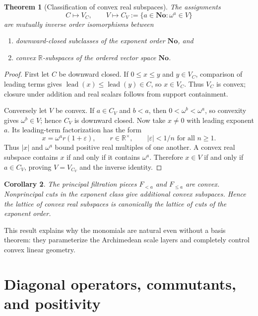 \documentclass[11pt,letterpaper]{article}
\numberwithin{equation}{section}
\newtheorem{theorem}{Theorem}[section]
\newtheorem{corollary}[theorem]{Corollary}
\theoremstyle{definition}
\theoremstyle{remark}
\newcommand{\No}{\mathbf{No}}
\newcommand{\R}{\mathbb{R}}
\newcommand{\lead}{\operatorname{lead}}
\begin{document}
\begin{theorem}[Classification of convex real subspaces]\label{rvs:cv:thm:convex-subspaces}
The assignments
\[
  C\longmapsto V_C,
  \qquad
  V\longmapsto C_V:=\{a\in\No:\omega^a\in V\}
\]
are mutually inverse order isomorphisms between
\begin{enumerate}[label=(\roman*)]
\item downward-closed subclasses of the exponent order $\No$, and
\item convex $\R$-subspaces of the ordered vector space $\No$.
\end{enumerate}
\end{theorem}

\begin{proof}
First let $C$ be downward closed. If $0\le x\le y$ and $y\in V_C$, comparison of
leading terms gives $\lead(x)\le\lead(y)\in C$, so $x\in V_C$. Thus $V_C$ is
convex; closure under addition and real scalars follows from support containment.

Conversely let $V$ be convex. If $a\in C_V$ and $b<a$, then
$0<\omega^b<\omega^a$, so convexity gives $\omega^b\in V$; hence $C_V$ is
downward closed. Now take $x\ne0$ with leading exponent $a$. Its leading-term
factorization has the form
\[
  x=\omega^a r(1+\varepsilon),
  \qquad r\in\R^\times,
  \qquad |\varepsilon|<1/n\text{ for all }n\ge1.
\]
Thus $|x|$ and $\omega^a$ bound positive real multiples of one another. A convex
real subspace contains $x$ if and only if it contains $\omega^a$. Therefore
$x\in V$ if and only if $a\in C_V$, proving $V=V_{C_V}$ and the inverse identity.
\end{proof}

\begin{corollary}
The principal filtration pieces $F_{<a}$ and $F_{\le a}$ are convex. Nonprincipal
cuts in the exponent class give additional convex subspaces. Hence the lattice of
convex real subspaces is canonically the lattice of cuts of the exponent order.
\end{corollary}

This result explains why the monomials are natural even without a basis theorem:
they parameterize the Archimedean scale layers and completely control convex
linear geometry.


\section{Diagonal operators, commutants, and positivity}\label{rvs:w:sec:diagonal}\label{rvs:cv:sec:diagonal}
\end{document}
